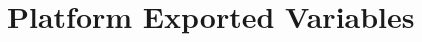 \hypertarget{group___s_d___platform___exported___variables}{}\section{Platform Exported Variables}
\label{group___s_d___platform___exported___variables}
